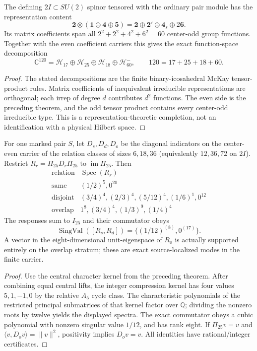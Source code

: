 \documentclass[12pt,a4paper]{article}
\begin{document}
\begin{proposition}
\label{p6:prop:v338-center-odd-completion}
The defining $2I\subset SU(2)$ spinor tensored with the ordinary
pair module has the representation content
\[
 \mathbf2\otimes(\mathbf1\oplus\mathbf4\oplus\mathbf5)
 =\mathbf2\oplus\mathbf2'\oplus\mathbf4_s\oplus2\mathbf6.
\]
Its matrix coefficients span all $2^2+2^2+4^2+6^2=60$
center-odd group functions.  Together with the even coefficient
carriers this gives the exact function-space decomposition
\[
 \mathbb C^{120}=\mathcal H_{17}\oplus\mathcal H_{25}
 \oplus\mathcal H_{18}\oplus\mathcal H_{60}^-,
 \qquad 120=17+25+18+60.
\]
\end{proposition}
\begin{proof}
The stated decompositions are the finite binary-icosahedral
McKay tensor-product rules.  Matrix coefficients of inequivalent
irreducible representations are orthogonal; each irrep of degree
$d$ contributes $d^2$ functions.  The even side is the preceding
theorem, and the odd tensor product contains every center-odd
irreducible type.  This is a representation-theoretic completion,
not an identification with a physical Hilbert space.
\end{proof}

\begin{theorem}
\label{p6:thm:v338-compressed-occupancy-spectrum}
For one marked pair $S$, let $D_s,D_d,D_o$ be the diagonal
indicators on the center-even carrier of the relation classes of
sizes $6,18,36$ (equivalently $12,36,72$ on $2I$).  Restrict
$R_r=\Pi_{25}D_r\Pi_{25}$ to $\operatorname{im}\Pi_{25}$. Then
\[
 \begin{array}{c|l}
 \text{relation}&\operatorname{Spec}(R_r)\\\hline
 \mathrm{same}&(1/2)^5,0^{20}\\
 \mathrm{disjoint}&(3/4)^4,(2/3)^4,(5/12)^4,(1/6)^1,0^{12}\\
 \mathrm{overlap}&1^8,(3/4)^4,(1/3)^9,(1/4)^4
 \end{array}
\]
The responses sum to $I_{25}$ and their commutator obeys
\[
 \operatorname{SingVal}([R_s,R_d])
   =\{(1/12)^{(8)},0^{(17)}\}.
\]
A vector in the eight-dimensional unit-eigenspace of $R_o$
is actually supported entirely on the overlap stratum; these are
exact source-localized modes in the finite carrier.
\end{theorem}
\begin{proof}
Use the central character kernel from the preceding theorem.
After combining equal central lifts, the integer compression kernel
has four values $5,1,-1,0$ by the relative $A_5$ cycle class.
The characteristic polynomials of the restricted principal
submatrices of that kernel factor over $\mathbb Q$; dividing the
nonzero roots by twelve yields the displayed spectra.  The exact
commutator obeys a cubic polynomial with nonzero singular value
$1/12$, and has rank eight.  If $\Pi_{25}v=v$ and
$\langle v,D_o v\rangle=\|v\|^2$, positivity implies $D_ov=v$.
All identities have rational/integer certificates.
\end{proof}
\end{document}
